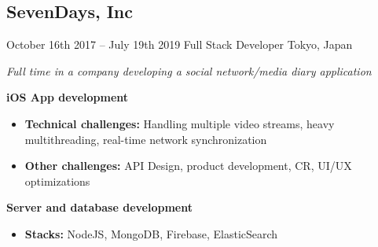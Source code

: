 \documentclass[]{template/friggeri-cv} %
\begin{document}
\subsection{SevenDays, Inc}
\begin{entrylist}


\entry
{October 16th 2017 -- July 19th 2019}
{Full Stack Developer}
{Tokyo, Japan}
{\emph{Full time in a company developing a social network/media diary application}

\textbf{iOS App development} 
\begin{itemize}
\item \textbf{Technical challenges:} Handling multiple video streams, heavy multithreading, real-time network synchronization
\item \textbf{Other challenges:} API Design, product development, CR, UI/UX optimizations
\end{itemize}
\textbf{Server and database development} 
\begin{itemize}
\item \textbf{Stacks:} NodeJS, MongoDB, Firebase, ElasticSearch

\end{itemize}


}
\end{entrylist}
\end{document}
